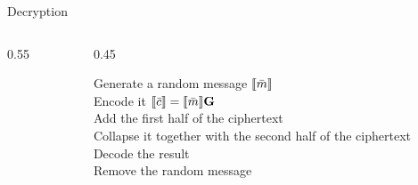 \begin{frame}{Decryption}
    \begin{columns}
        \begin{column}{0.55\textwidth}
            \begin{algorithm2e}[H]
            
        
            \end{algorithm2e}
        \end{column}
        \begin{column}{0.45\textwidth}
            \begin{block}{}
                Generate a random message $ \llbracket \bar{m} \rrbracket $\\
                Encode it $ \llbracket \bar{c} \rrbracket  =  \llbracket \bar{m} \rrbracket \mathbf{G}$\\
                Add the first half of the ciphertext\\
                Collapse it together with the second half of the ciphertext\\
                Decode the result\\
                Remove the random message
            \end{block}
        \end{column}
    \end{columns}
    
\end{frame}
